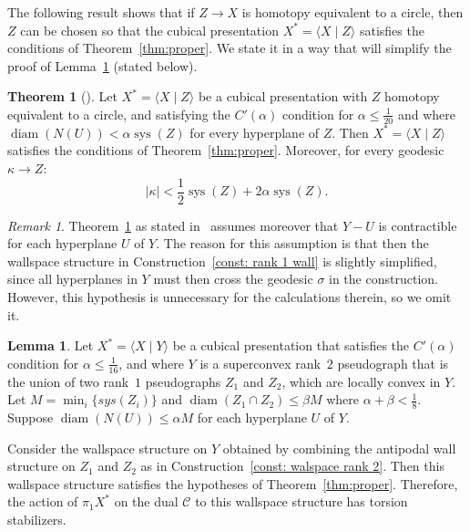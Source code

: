 \documentclass[12pt,oneside]{amsart}
\theoremstyle{definition}
\newtheorem{theorem}[thm]{Theorem}
\newtheorem{lemma}[thm]{Lemma}
\theoremstyle{definition}
\theoremstyle{remark}
\newtheorem{remark}[thm]{Remark}
\DeclareMathOperator{\diam}{\text{diam}}
\DeclareMathOperator{\sys}{\mathrm sys}
\begin{document}
The following result shows that if    $Z\rightarrow X$ is homotopy equivalent to a circle, then $Z$  can be chosen so that the cubical presentation $X^*=\langle X \mid Z \rangle$  satisfies the conditions of Theorem~\ref{thm:proper}. We state it in a way that will simplify the proof of Lemma~\ref{lem: wallspace structure freeness} (stated below).

\begin{theorem}[{\cite[Thm~3.5]{FuterWise}}]\label{thm:FuterWise}
    Let $X^*= \langle X \mid Z \rangle $ be a cubical presentation with $Z$ homotopy equivalent to a circle, and satisfying the $C'(\alpha)$ condition for $\alpha\leq \frac{1}{20}$ and where $\diam (N(U)) < \alpha \sys(Z)$ for every hyperplane of  $Z$.  Then  $X^*= \langle X \mid Z \rangle $ satisfies the conditions of Theorem~\ref{thm:proper}. Moreover, for every geodesic $\kappa \rightarrow Z$:
    $$
   |\kappa| < \frac{1}{2}\sys(Z) + 2\alpha \sys(Z).$$
\end{theorem}

\begin{remark}
   Theorem~\ref{thm:FuterWise} as stated in~\cite{FuterWise} assumes moreover that $Y - U$ is contractible for each hyperplane $U$ of $Y$. The reason for this assumption is that then the wallspace structure in Construction~\ref{const: rank 1 wall} is slightly simplified, since all hyperplanes in $Y$ must then cross the geodesic $\sigma$ in the construction. However, this hypothesis is unnecessary for the calculations therein, so we omit it.
\end{remark}

\begin{lemma}\label{lem: wallspace structure freeness}
   Let $X^*=\langle X \mid Y \rangle $ be a cubical presentation that satisfies the $C'(\alpha)$ condition for $\alpha\leq\frac{1}{16}$, and where $Y$ is a superconvex rank~$2$ pseudograph that is the union of two rank~$1$ pseudographs  $Z_1$ and $Z_2$, which are locally convex in $Y$. 
   Let $M=\min_i\{sys(Z_i)\}$ and  $\diam (Z_1 \cap Z_2)\leq \beta M$ where $\alpha + \beta <\frac{1}{8}$. 
Suppose $\diam (N(U))\leq \alpha M$ for each hyperplane $U$ of $Y$.
   
   
   Consider the wallspace structure on $Y$ obtained by combining the antipodal wall structure on $Z_1$ and $Z_2$ as in Construction~\ref{const: walspace rank 2}. Then this wallspace structure satisfies the hypotheses of Theorem~\ref{thm:proper}. Therefore, the action of $\pi_1 X^*$ on the dual $\mathcal{C}$ to this wallspace structure has torsion stabilizers.
\end{lemma}
\end{document}
